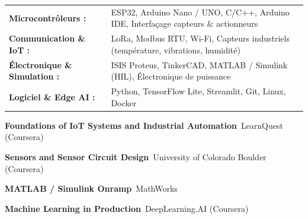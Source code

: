 \documentclass[10pt,a4paper]{../altacv}
\begin{document}
\begin{tabular}{@{}ll@{}}
\textbf{Microcontrôleurs :} & ESP32, Arduino Nano / UNO, C/C++, Arduino IDE, Interfaçage capteurs \& actionneurs \\[1.5pt]
\textbf{Communication \& IoT :} & LoRa, Modbus RTU, Wi-Fi, Capteurs industriels (température, vibrations, humidité) \\[1.5pt]
\textbf{Électronique \& Simulation :} & ISIS Proteus, TinkerCAD, MATLAB / Simulink (HIL), Électronique de puissance \\[1.5pt]
\textbf{Logiciel \& Edge AI :} & Python, TensorFlow Lite, Streamlit, Git, Linux, Docker
\end{tabular}

\begin{cvitems}
  \item \textbf{Foundations of IoT Systems and Industrial Automation}~\hfill {\color{emphasis}LearnQuest (Coursera)}
  \item \textbf{Sensors and Sensor Circuit Design}~\hfill {\color{emphasis}University of Colorado Boulder (Coursera)}
  \item \textbf{MATLAB / Simulink Onramp}~\hfill {\color{emphasis}MathWorks}
  \item \textbf{Machine Learning in Production}~\hfill {\color{emphasis}DeepLearning.AI (Coursera)}
\end{cvitems}

\cvactivites
\cvlangues
\end{document}

